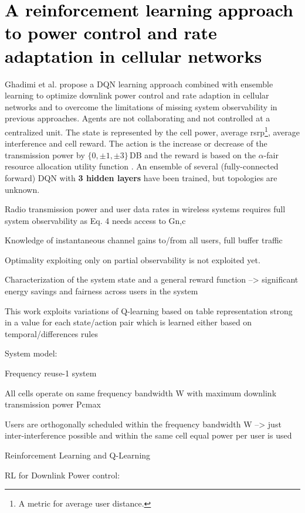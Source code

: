 \section{\textcolor{black}{A reinforcement learning approach to power control and rate adaptation in cellular networks \cite{Ghadimi2017}}}
Ghadimi et al. propose a DQN learning approach combined with ensemble learning to optimize downlink power control and rate adaption in cellular networks and to overcome the limitations of missing system observability in previous approaches.
Agents are not collaborating and not controlled at a centralized unit. The state is represented by the cell power, average \gls{rsrp}\footnote{A metric for average user distance.}, average interference and cell reward. The action is the increase or decrease of the transmission power by $\{0, \pm1, \pm3\}$\,DB and the reward is based on the $\alpha$-fair resource allocation utility function \cite{touati2002utility}. An ensemble of several (fully-connected forward) DQN with \textbf{3 hidden layers} have been trained, but topologies are unknown.

\ifdefined\SHOWNOTES

    Radio transmission power and user data rates in wireless systems requires full system observability as Eq. 4 needs access to Gn,c  

    Knowledge of instantaneous channel gains to/from all users, full buffer traffic 

    Optimality exploiting only on partial observability is not exploited yet. 

    Characterization of the system state and a general reward function –> significant energy savings and fairness across users in the system 

    This work exploits variations of Q-learning based on table representation strong in a value for each state/action pair which is learned either based on temporal/differences rules 

System model: 

    Frequency reuse-1 system 

    All cells operate on same frequency bandwidth W with maximum downlink transmission power Pcmax 

    Users are orthogonally scheduled within the frequency bandwidth W --> just inter-interference possible and within the same cell equal power per user is used 

Reinforcement Learning and Q-Learning 

RL for Downlink Power control: 

